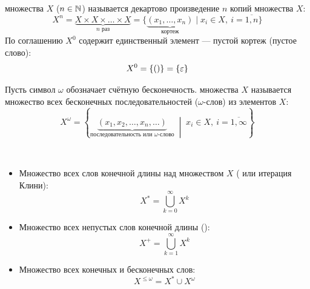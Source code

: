 \begin{definition}
     множества $X$ ($n \in \mathbb{N}$) 
    называется декартово произведение $n$ копий множества $X$:
    \begin{equation} \label{eq:cart_pow_n}
        X^n = \underbrace{X \times X \times \dots \times X}_{n \text{ раз}} = 
        \{\underbrace{(x_1, \dots, x_n)}_{\text{кортеж}} \mid 
        x_i \in X, \ i = \overline{1, n}\} \tag{7}
    \end{equation}
    По соглашению  $X^0$ содержит 
    единственный элемент --- пустой кортеж (пустое слово):
    \[
        X^0 = \{ () \} = \{ \varepsilon \}
    \]
\end{definition}

\begin{definition}
    Пусть символ $\omega$ обозначает счётную бесконечность. 
     множества $X$ называется 
    множество всех бесконечных последовательностей ($\omega$-слов) 
    из элементов $X$:
    \begin{equation} \label{eq:cart_pow_omega}
        X^\omega = \left\{
            \underbrace{(x_1, x_2, \dots, x_n, \dots)}_{
                \text{последовательность или } \omega\text{-слово}
            } \;\middle|\; x_i \in X, \ i = \overline{1, \infty}
        \right\} \tag{8}
    \end{equation}
\end{definition}

\begin{designation} ~
    \begin{itemize}
        \item Множество всех слов конечной длины над множеством $X$ 
        ( или итерация Клини):
        \begin{equation} \label{eq:kleene_star}
            X^* = \bigcup_{k=0}^{\infty} X^k \tag{9}
        \end{equation}
        \item Множество всех непустых слов конечной длины ():
        \begin{equation} \label{eq:kleene_plus}
            X^+ = \bigcup_{k=1}^{\infty} X^k \tag{10}
        \end{equation}
        \item Множество всех конечных и бесконечных слов:
        \[
            X^{\le \omega} = X^* \cup X^\omega
        \]
    \end{itemize}
\end{designation}

